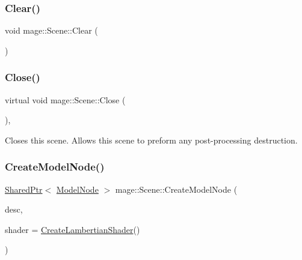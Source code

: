 \hypertarget{classmage_1_1_scene_a916cc7a0867bf1c09e5d10de53192140}{}\label{classmage_1_1_scene_a916cc7a0867bf1c09e5d10de53192140} 
\subsubsection{\texorpdfstring{Clear()}{Clear()}}
{\footnotesize\ttfamily void mage\+::\+Scene\+::\+Clear (\begin{DoxyParamCaption}{ }\end{DoxyParamCaption})\hspace{0.3cm}{\ttfamily [private]}}

\hypertarget{classmage_1_1_scene_a16786d7fcf0b813e2e94061b082cfd1d}{}\label{classmage_1_1_scene_a16786d7fcf0b813e2e94061b082cfd1d} 
\subsubsection{\texorpdfstring{Close()}{Close()}}
{\footnotesize\ttfamily virtual void mage\+::\+Scene\+::\+Close (\begin{DoxyParamCaption}{ }\end{DoxyParamCaption})\hspace{0.3cm}{\ttfamily [private]}, {\ttfamily [virtual]}}

Closes this scene. Allows this scene to preform any post-\/processing destruction. \hypertarget{classmage_1_1_scene_a8ff21b5512cfbc053d96882a5d30996e}{}\label{classmage_1_1_scene_a8ff21b5512cfbc053d96882a5d30996e} 
\subsubsection{\texorpdfstring{Create\+Model\+Node()}{CreateModelNode()}}
{\footnotesize\ttfamily \hyperlink{namespacemage_a1e01ae66713838a7a67d30e44c67703e}{Shared\+Ptr}$<$ \hyperlink{classmage_1_1_model_node}{Model\+Node} $>$ mage\+::\+Scene\+::\+Create\+Model\+Node (\begin{DoxyParamCaption}\item[{const \hyperlink{classmage_1_1_model_descriptor}{Model\+Descriptor} \&}]{desc,  }\item[{const \hyperlink{structmage_1_1_combined_shader}{Combined\+Shader} \&}]{shader = {\ttfamily \hyperlink{namespacemage_a91a20907d6a7a77bdd768dbd0bc420c5}{Create\+Lambertian\+Shader}()} }\end{DoxyParamCaption})}

